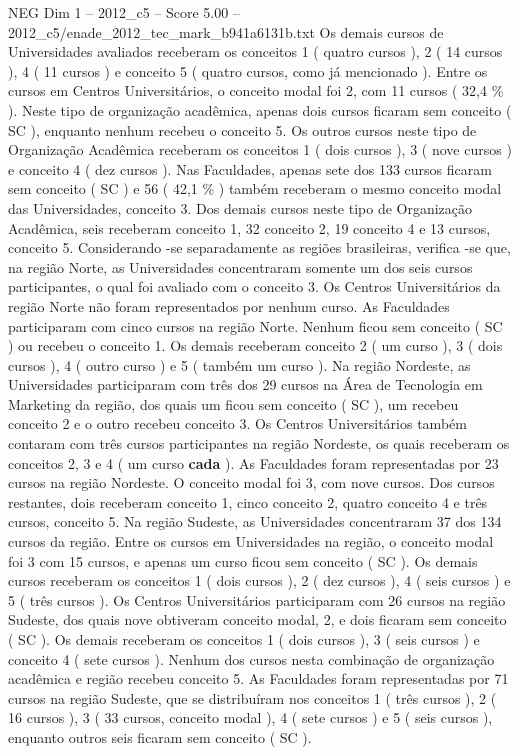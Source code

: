 \begin{textsample}{NEG Dim 1 – 2012\_c5 – Score 5.00 – 2012\_c5/enade\_2012\_tec\_mark\_b941a6131b.txt}
Os demais cursos de Universidades avaliados receberam os conceitos 1 ( quatro cursos ), 2 ( 14 cursos ), 4 ( 11 cursos ) e conceito 5 ( quatro cursos, como já mencionado ).
Entre os cursos em Centros Universitários, o conceito modal foi 2, com 11 cursos ( 32,4 \% ).
Neste tipo de organização acadêmica, apenas dois cursos ficaram sem conceito ( SC ), enquanto nenhum recebeu o conceito 5.
Os outros cursos neste tipo de Organização Acadêmica receberam os conceitos 1 ( dois cursos ), 3 ( nove cursos ) e conceito 4 ( dez cursos ).
Nas Faculdades, apenas sete dos 133 cursos ficaram sem conceito ( SC ) e 56 ( 42,1 \% ) também receberam o mesmo conceito modal das Universidades, conceito 3.
Dos demais cursos neste tipo de Organização Acadêmica, seis receberam conceito 1, 32 conceito 2, 19 conceito 4 e 13 cursos, conceito 5.
Considerando -se separadamente as regiões brasileiras, verifica -se que, na região Norte, as Universidades concentraram somente um dos seis cursos participantes, o qual foi avaliado com o conceito 3.
Os Centros Universitários da região Norte não foram representados por nenhum curso.
As Faculdades participaram com cinco cursos na região Norte.
Nenhum ficou sem conceito ( SC ) ou recebeu o conceito 1.
Os demais receberam conceito 2 ( um curso ), 3 ( dois cursos ), 4 ( outro curso ) e 5 ( também um curso ).
Na região Nordeste, as Universidades participaram com três dos 29 cursos na Área de Tecnologia em Marketing da região, dos quais um ficou sem conceito ( SC ), um recebeu conceito 2 e o outro recebeu conceito 3.
Os Centros Universitários também contaram com três cursos participantes na região Nordeste, os quais receberam os conceitos 2, 3 e 4 ( um curso \textbf{cada} ).
As Faculdades foram representadas por 23 cursos na região Nordeste.
O conceito modal foi 3, com nove cursos.
Dos cursos restantes, dois receberam conceito 1, cinco conceito 2, quatro conceito 4 e três cursos, conceito 5.
Na região Sudeste, as Universidades concentraram 37 dos 134 cursos da região.
Entre os cursos em Universidades na região, o conceito modal foi 3 com 15 cursos, e apenas um curso ficou sem conceito ( SC ).
Os demais cursos receberam os conceitos 1 ( dois cursos ), 2 ( dez cursos ), 4 ( seis cursos ) e 5 ( três cursos ).
Os Centros Universitários participaram com 26 cursos na região Sudeste, dos quais nove obtiveram conceito modal, 2, e dois ficaram sem conceito ( SC ).
Os demais receberam os conceitos 1 ( dois cursos ), 3 ( seis cursos ) e conceito 4 ( sete cursos ).
Nenhum dos cursos nesta combinação de organização acadêmica e região recebeu conceito 5.
As Faculdades foram representadas por 71 cursos na região Sudeste, que se distribuíram nos conceitos 1 ( três cursos ), 2 ( 16 cursos ), 3 ( 33 cursos, conceito modal ), 4 ( sete cursos ) e 5 ( seis cursos ), enquanto outros seis ficaram sem conceito ( SC ).

\end{textsample}
